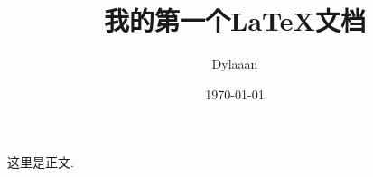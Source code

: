 \documentclass[12pt, a4paper, oneside]{ctexart}
\title{我的第一个\LaTeX 文档}
\author{Dylaaan}
\date{\today}
\begin{document}
	
	\maketitle
	
	这里是正文. 
	
\end{document}
